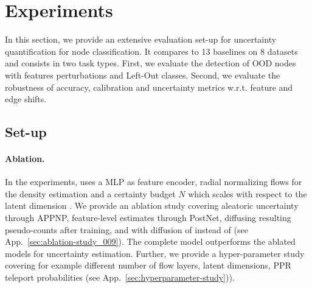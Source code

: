 \section{Experiments} 
\label{sec:experiments_009}

In this section, we provide an extensive evaluation set-up for uncertainty quantification for node classification. It compares \textbf{\GPNacro{}} to 13 baselines on 8 datasets and consists in two task types. First, we evaluate the detection of OOD nodes with features perturbations and Left-Out classes. Second, we evaluate the robustness of accuracy, calibration and uncertainty metrics w.r.t. feature and edge shifts.

\subsection{Set-up}

\paragraph{Ablation.} In the experiments, \GPNacro{} uses a MLP as feature encoder, radial normalizing flows \citep{radialflow} for the density estimation and a certainty budget $N$ which scales with respect to the latent dimension \citep{NatPN2021}. We provide an ablation study covering aleatoric uncertainty through APPNP, feature-level estimates through PostNet, diffusing resulting pseudo-counts after training, and \GPNacro{} with diffusion of  instead of  (see App.~\ref{sec:ablation-study_009}). The complete \GPNacro{} model outperforms the ablated models for uncertainty estimation. Further, we provide a hyper-parameter study covering for example different number of flow layers, latent dimensions, PPR teleport probabilities (see App.~\ref{sec:hyperparameter-study})). 

